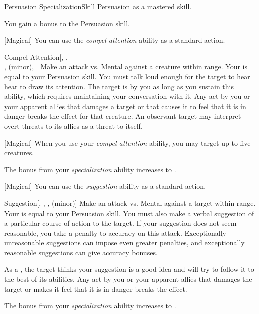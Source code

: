     \begin{feat}{Persuasion Specialization}{Skill}
        \featpre Persuasion as a mastered skill.

         You gain a  bonus to the Persuasion skill.

        [Magical] You can use the \textit{compel attention} ability as a standard action.
        \begin{apability}{Compel Attention}[, ,\\,  (minor), ]
            Make an attack vs. Mental against a creature within \rngmed range.
            Your  is equal to your Persuasion skill.
            You must talk loud enough for the target to hear hear to draw its attention.
            \hit The target is  by you as long as you sustain this ability, which requires maintaining your conversation with it.
            Any act by you or your apparent allies that damages a target or that causes it to feel that it is in danger breaks the effect for that creature.
            An observant target may interpret overt threats to its allies as a threat to itself.
        \end{apability}

        [Magical] When you use your \textit{compel attention} ability, you may target up to five creatures.

         The bonus from your \textit{specialization} ability increases to .

        [Magical] You can use the \textit{suggestion} ability as a standard action.
        \begin{apability}{Suggestion}[, , ,  (minor)]
            Make an attack vs. Mental against a target within \rngmed range.
            Your  is equal to your Persuasion skill.
            You must also make a verbal suggestion of a particular course of action to the target.
            If your suggestion does not seem reasonable, you take a  penalty to accuracy on this attack.
            Exceptionally unreasonable suggestions can impose even greater penalties, and exceptionally reasonable suggestions can give accuracy bonuses.

            \hit As a , the target thinks your suggestion is a good idea and will try to follow it to the best of its abilities.
            Any act by you or your apparent allies that damages the target or makes it feel that it is in danger breaks the effect.

        \end{apability}

         The bonus from your \textit{specialization} ability increases to .
    \end{feat}

